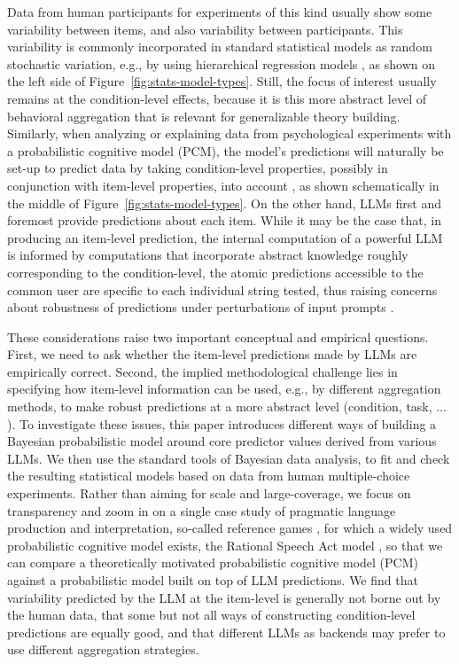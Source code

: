 \documentclass[fleqn]{article}
\begin{document}
Data from human participants for experiments of this kind usually show some variability between items, and also variability between participants.
This variability is commonly incorporated in standard statistical models as random stochastic variation, e.g., by using hierarchical regression models \citep{Jaeger2008:Categorical-dat,barr2013,SorensenHohensteinb2016:Bayesian-linear}, as shown on the left side of Figure~\ref{fig:stats-model-types}.
Still, the focus of interest usually remains at the condition-level effects, because it is this more abstract level of behavioral aggregation that is relevant for generalizable theory building.
Similarly, when analyzing or explaining data from psychological experiments with a probabilistic cognitive model (PCM), the model's predictions will naturally be set-up to predict data by taking condition-level properties, possibly in conjunction with item-level properties, into account \citep[e.g.,][]{NilsonRieskamp2011:Hierarchical-Ba,Lee2011:How-Cognitive-M,ScheibehenneRieskamp2013:Testing-the-Ada}, as shown schematically in the middle of Figure~\ref{fig:stats-model-types}.
On the other hand, LLMs first and foremost provide predictions about each item.
While it may be the case that, in producing an item-level prediction, the internal computation of a powerful LLM is informed by computations that incorporate abstract knowledge roughly corresponding to the condition-level, the atomic predictions accessible to the common user are specific to each individual string tested, thus raising concerns about robustness of predictions under perturbations of input prompts .

These considerations raise two important conceptual and empirical questions.
First, we need to ask whether the item-level predictions made by LLMs are empirically correct.
Second, the implied methodological challenge lies in specifying how item-level information can be used, e.g., by different aggregation methods, to make robust predictions at a more abstract level (condition, task, $\dots$).
To investigate these issues, this paper introduces different ways of building a Bayesian probabilistic model around core predictor values derived from various LLMs.
We then use the standard tools of Bayesian data analysis, to fit and check the resulting statistical models based on data from human multiple-choice experiments.
Rather than aiming for scale and large-coverage, we focus on transparency and zoom in on a single case study of pragmatic language production and interpretation, so-called reference games , for which a widely used probabilistic cognitive model exists, the Rational Speech Act model \citep{FrankGoodman2012:Predicting-Prag}, so that we can compare a theoretically motivated probabilistic cognitive model (PCM) against a probabilistic model built on top of LLM predictions.
We find that variability predicted by the LLM at the item-level is generally not borne out by the human data, that some but not all ways of constructing condition-level predictions are equally good, and that different LLMs as backends may prefer to use different aggregation strategies.
\end{document}
